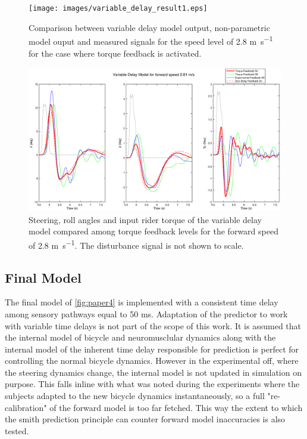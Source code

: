 \begin{figure}[!h]
    \centering
    \captionsetup{justification=centering,margin=2cm}

    \texttt{[image: images/variable\_delay\_result1.eps]}
    \caption{Comparison between variable delay model output, non-parametric model ouput and measured signals for the speed level of 2.8 \si{\meter\per\second} for the case where torque feedback is activated.}
    \label{fig:paper7}
\end{figure}

\begin{figure}[!h]
    \centering
    \captionsetup{justification=centering,margin=2cm}

    \includegraphics[width=\textwidth]{images/variable_delay_compare.eps}
    \caption{Steering, roll angles and input rider torque of the variable delay model  compared among torque feedback levels  for the forward speed of 2.8 \si{\meter\per\second}. The disturbance signal is not shown  to scale.}
    \label{fig:paper8}
\end{figure}


    \subsection{Final Model}

The final model of  \cref{fig:paper4} is implemented with a consistent time delay among sensory pathways equal to 50 \si{\milli\second}. Adaptation of the predictor to work with variable time delays is not part of the scope of this work. It is assumed that the internal model of bicycle and neuromusclular dynamics along with the internal model of the inherent time delay responsible for prediction is perfect for controlling the normal bicycle dynamics. However in the experimental off, where the steering dynamics change, the internal model is not updated in simulation on purpose. This falls inline with what was noted during the experiments where the subjects adapted to the new bicycle dynamics instantaneously, so a full "re-calibration" of the forward model is too far fetched. This way the extent to which the smith prediction principle can counter forward model inaccuracies is also tested. 


